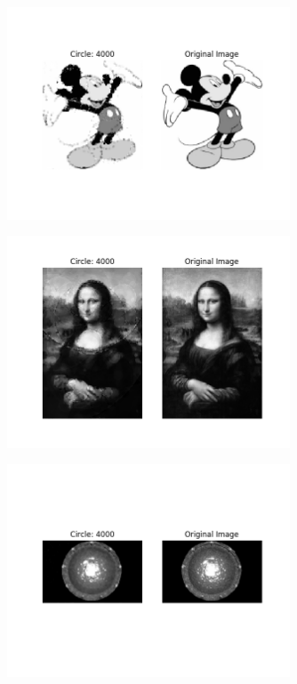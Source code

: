 \documentclass[12pt]{article}
\begin{document}
\begin{figure}[H]
\centering
\noindent\includegraphics[width=0.75\textwidth]{../results/mickey/mickey_4000}
\end{figure}

\begin{figure}[H]
\centering
\noindent\includegraphics[width=0.75\textwidth]{../results/mona_lisa/mona_lisa_4000}
\end{figure}

\begin{figure}[H]
\centering
\noindent\includegraphics[width=0.75\textwidth]{../results/stargate/stargate_4000}
\end{figure}
\end{document}
